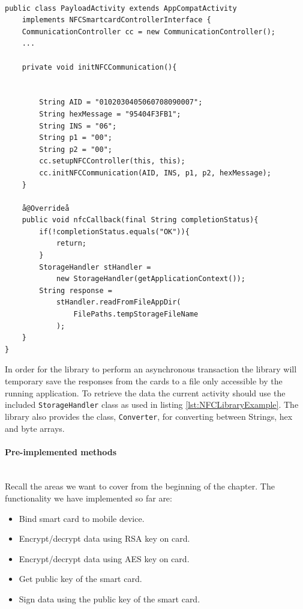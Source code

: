 \begin{lstlisting}[caption=Java code example showing how to send and receive commands to a NFC smart card., label=lst:NFCLibraryExample,escapechar=å]

public class PayloadActivity extends AppCompatActivity
    implements NFCSmartcardControllerInterface {
    CommunicationController cc = new CommunicationController();
    ...

    private void initNFCCommunication(){


        String AID = "0102030405060708090007";
        String hexMessage = "95404F3FB1";
        String INS = "06";
        String p1 = "00";
        String p2 = "00";
        cc.setupNFCController(this, this);
        cc.initNFCCommunication(AID, INS, p1, p2, hexMessage);
    }

    å@Overrideå
    public void nfcCallback(final String completionStatus){
        if(!completionStatus.equals("OK")){
            return;
        }
        StorageHandler stHandler =
            new StorageHandler(getApplicationContext());
        String response =
            stHandler.readFromFileAppDir(
                FilePaths.tempStorageFileName
            );
    }
}

\end{lstlisting}

In order for the library to perform an asynchronous transaction the library will temporary save the responses from the cards to a file only accessible by the running application. To retrieve the data the current activity should use the included \texttt{StorageHandler} class as used in listing \ref{lst:NFCLibraryExample}. The library also provides the class, \texttt{Converter}, for converting between Strings, hex and byte arrays.

\paragraph{Pre-implemented methods}\mbox{}\\
Recall the areas we want to cover from the beginning of the chapter. The functionality we have implemented so far are:

\begin{itemize}
    \item Bind smart card to mobile device.
    \item Encrypt/decrypt data using RSA key on card.
    \item Encrypt/decrypt data using AES key on card.
    \item Get public key of the smart card.
    \item Sign data using the public key of the smart card.
\end{itemize}

